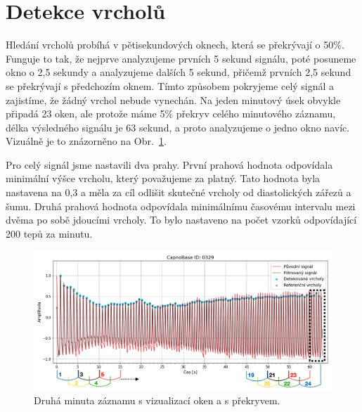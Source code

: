 \section{Detekce vrcholů}
\label{sec:alg_peaks}
Hledání vrcholů probíhá v pětisekundových oknech, která se překrývají o 50\%.
Funguje to tak, že nejprve analyzujeme prvních 5 sekund signálu, poté posuneme okno o 2,5 sekundy a analyzujeme dalších 5 sekund, přičemž prvních 2,5 sekund se překrývají s předchozím oknem.
Tímto způsobem pokryjeme celý signál a zajistíme, že žádný vrchol nebude vynechán.
Na jeden minutový úsek obvykle připadá 23 oken, ale protože máme 5\% překryv celého minutového záznamu, délka výsledného signálu je 63 sekund, a proto analyzujeme o jedno okno navíc.
Vizuálně je to znázorněno na Obr.~\ref{fig:my-detection}.

Pro celý signál jsme nastavili dva prahy.
První prahová hodnota odpovídala minimální výšce vrcholu, který považujeme za platný.
Tato hodnota byla nastavena na 0,3 a měla za cíl odlišit skutečné vrcholy od diastolických zářezů a šumu.
Druhá prahová hodnota odpovídala minimálnímu časovému intervalu mezi dvěma po sobě jdoucími vrcholy.
To bylo nastaveno na počet vzorků odpovídající 200 tepů za minutu.

\begin{figure} [h]
	\label{fig:my-detection}
	\centering
	\includegraphics[width=1\textwidth]{./obrazky/My_peaks.png}
	\caption[Vlastní detekce vrcholů]{Druhá minuta záznamu s vizualizací oken a s překryvem.}
\end{figure}

